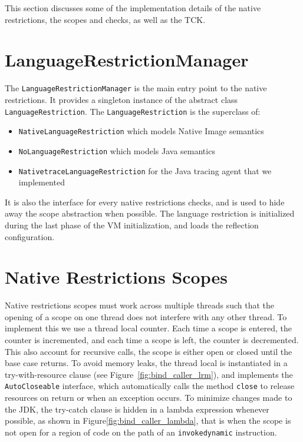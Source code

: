 This section discusses some of the implementation details of the native restrictions, the scopes and checks, as well as the TCK.

\section{LanguageRestrictionManager}
The \verb|LanguageRestrictionManager| is the main entry point to the native restrictions. It provides a singleton instance of the abstract class \verb|LanguageRestriction|.
The \verb|LanguageRestriction| is the superclass of: 
\begin{itemize}
    \item \texttt{NativeLanguageRestriction} which models Native Image semantics
    \item \texttt{NoLanguageRestriction} which  models Java semantics
    \item \texttt{NativetraceLanguageRestriction} for the Java tracing agent that we implemented
\end{itemize}

It is also the interface for every native restrictions checks, and is used to hide away the scope abstraction when possible.
The language restriction is initialized during the last phase of the VM initialization, and loads the reflection configuration.
\section{Native Restrictions Scopes}
Native restrictions scopes must work across multiple threads such that the opening of a scope on one thread does not interfere with any other thread. To implement this we use a thread local counter.
Each time a scope is entered, the counter is incremented, and each time a scope is left, the counter is decremented. 
This also account for recursive calls, the scope is either open or closed until the base case returns.
To avoid memory leaks, the thread local is instantiated in a try-with-resource clause (see Figure~\ref{fig:bind_caller_lrm}), and implements the \verb|AutoCloseable| interface, which automatically calls the method \verb|close| to release resources on return or when an exception occurs.
To minimize changes made to the JDK, the try-catch clause is hidden in a lambda expression whenever possible, as shown in Figure\ref{fig:bind_caller_lambda}, that is when the scope is not open for a region of code on the path of an \verb|invokedynamic| instruction.

